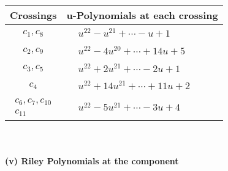 \documentclass[1p]{elsarticle_modified}
\theoremstyle{definition}
\begin{document}
\begin{tabular}{m{50pt}|m{274pt}}
Crossings & \hspace{64pt}u-Polynomials at each crossing \\
\hline $$\begin{aligned}c_{1},c_{8}\end{aligned}$$&$\begin{aligned}
&u^{22}- u^{21}+\cdots- u+1
\end{aligned}$\\
\hline $$\begin{aligned}c_{2},c_{9}\end{aligned}$$&$\begin{aligned}
&u^{22}-4 u^{20}+\cdots+14 u+5
\end{aligned}$\\
\hline $$\begin{aligned}c_{3},c_{5}\end{aligned}$$&$\begin{aligned}
&u^{22}+2 u^{21}+\cdots-2 u+1
\end{aligned}$\\
\hline $$\begin{aligned}c_{4}\end{aligned}$$&$\begin{aligned}
&u^{22}+14 u^{21}+\cdots+11 u+2
\end{aligned}$\\
\hline $$\begin{aligned}c_{6},c_{7},c_{10}\\c_{11}\end{aligned}$$&$\begin{aligned}
&u^{22}-5 u^{21}+\cdots-3 u+4
\end{aligned}$\\
\hline
\end{tabular}\\~\\
\newpage\renewcommand{\arraystretch}{1}
\flushleft \textbf{(v) Riley Polynomials at the component}\newline \\
\end{document}
